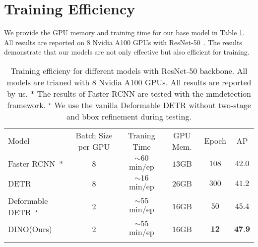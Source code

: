 \documentclass[runningheads]{llncs}
\begin{document}
\section{Training Efficiency}
We provide the GPU memory and training time for our base model in Table \ref{tab:gpu_memory}. All results are reported on 8 Nvidia A100 GPUs with ResNet-50~\cite{he2015deep}. The results demonstrate that our models are not only effective but also efficient for training. 
\begin{table}[h]
    \centering
    \begin{tabular}{l|c|c|c|c|c}
	\shline
	Model & Batch Size per GPU & Traning Time & GPU Mem. & Epoch & AP \\
	\shline
	Faster RCNN~\cite{ren2015faster}* & 8 & $\sim 60$min/ep & $13$GB & $108$ & $42.0$ \\
	DETR~\cite{carion2020end} & 8 & $\sim 16$min/ep & $26$GB & $300$  & $41.2$ \\
	Deformable DETR~\cite{zhu2020deformable}$^{\star}$ & 2 & $\sim 55$min/ep & $16$GB & $50$  & $45.4$ \\
	DINO(Ours) & 2 &  $\sim 55$min/ep & $16$GB & $\textbf{12}$  & $\textbf{47.9}$ \\
	\shline
    \end{tabular}
    \vspace{0.3cm}
    \caption{Training efficieny for different models with ResNet-50 backbone. All models are trianed with 8 Nvidia A100 GPUs. All results are reported by us. * The results of Faster RCNN are tested with the mmdetection framework. $^{\star}$ We use the vanilla Deformable DETR without two-stage and bbox refinement during testing.
}
    \label{tab:gpu_memory}
\end{table}
\end{document}
